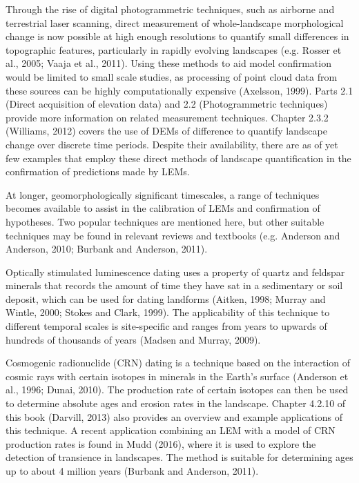 Through the rise of digital photogrammetric techniques, such as airborne and terrestrial laser scanning, direct measurement of whole-landscape morphological change is now possible at high enough resolutions to quantify small differences in topographic features, particularly in rapidly evolving landscapes (e.g. Rosser et al., 2005; Vaaja et al., 2011). Using these methods to aid model confirmation would be limited to small scale studies, as processing of point cloud data from these sources can be highly computationally expensive (Axelsson, 1999). Parts 2.1 (Direct acquisition of elevation data) and 2.2 (Photogrammetric techniques) provide more information on related measurement techniques. Chapter 2.3.2 (Williams, 2012) covers the use of DEMs of difference to quantify landscape change over discrete time periods. Despite their availability, there are as of yet few examples that employ these direct methods of landscape quantification in the confirmation of predictions made by LEMs.

At longer, geomorphologically significant timescales, a range of techniques becomes available to assist in the calibration of LEMs and confirmation of hypotheses. Two popular techniques are mentioned here, but other suitable techniques may be found in relevant reviews and textbooks (e.g. Anderson and Anderson, 2010; Burbank and Anderson, 2011). 

Optically stimulated luminescence dating uses a property of quartz and feldspar minerals that records the amount of time they have sat in a sedimentary or soil deposit, which can be used for dating landforms (Aitken, 1998; Murray and Wintle, 2000; Stokes and Clark, 1999). The applicability of this technique to different temporal scales is site-specific and ranges from years to upwards of hundreds of thousands of years (Madsen and Murray, 2009).

Cosmogenic radionuclide (CRN) dating is a technique based on the interaction of cosmic rays with certain isotopes in minerals in the Earth's surface (Anderson et al., 1996; Dunai, 2010). The production rate of certain isotopes can then be used to determine absolute ages and erosion rates in the landscape. Chapter 4.2.10 of this book (Darvill, 2013) also provides an overview and example applications of this technique. A recent application combining an LEM with a model of CRN production rates is found in Mudd (2016), where it is used to explore the detection of transience in landscapes. The method is suitable for determining ages up to about 4 million years (Burbank and Anderson, 2011).

